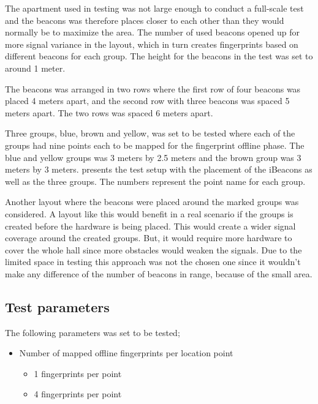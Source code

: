 \bigskip

The apartment used in testing was not large enough to conduct a full-scale test and the beacons was therefore places closer to each other than they would normally be to maximize the area.
The number of used beacons opened up for more signal variance in the layout, which in turn creates fingerprints based on different beacons for each group.
The height for the beacons in the test was set to around 1 meter.

\bigskip

The beacons was arranged in two rows where the first row of four beacons was placed 4 meters apart, and the second row with three beacons was spaced 5 meters apart.
The two rows was spaced 6 meters apart.

\bigskip


Three groups, blue, brown and yellow, was set to be tested where each of the groups had nine points each to be mapped for the fingerprint offline phase.
The blue and yellow groups was 3 meters by 2.5 meters and the brown group was 3 meters by 3 meters.
 presents the test setup with the placement of the iBeacons as well as the three groups.
The numbers represent the point name for each group.


Another layout where the beacons were placed around the marked groups was considered.
A layout like this would benefit in a real scenario if the groups is created before the hardware is being placed.
This would create a wider signal coverage around the created groups.
But, it would require more hardware to cover the whole hall since more obstacles would weaken the signals.
Due to the limited space in testing this approach was not the chosen one since it wouldn't make any difference of the number of beacons in range, because of the small area.

\newpage

\subsection{Test parameters}\label{sec:methodTestParameters}
The following parameters was set to be tested;

\begin{itemize}
\item Number of mapped offline fingerprints per location point
	\begin{itemize}
		\item 1 fingerprints per point
		\item 4 fingerprints per point
	\end{itemize}
\end{itemize}

